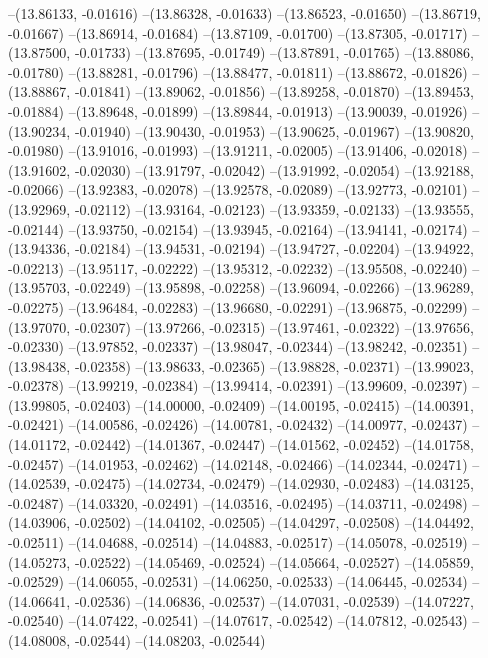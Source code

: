 --(13.86133, -0.01616)
--(13.86328, -0.01633)
--(13.86523, -0.01650)
--(13.86719, -0.01667)
--(13.86914, -0.01684)
--(13.87109, -0.01700)
--(13.87305, -0.01717)
--(13.87500, -0.01733)
--(13.87695, -0.01749)
--(13.87891, -0.01765)
--(13.88086, -0.01780)
--(13.88281, -0.01796)
--(13.88477, -0.01811)
--(13.88672, -0.01826)
--(13.88867, -0.01841)
--(13.89062, -0.01856)
--(13.89258, -0.01870)
--(13.89453, -0.01884)
--(13.89648, -0.01899)
--(13.89844, -0.01913)
--(13.90039, -0.01926)
--(13.90234, -0.01940)
--(13.90430, -0.01953)
--(13.90625, -0.01967)
--(13.90820, -0.01980)
--(13.91016, -0.01993)
--(13.91211, -0.02005)
--(13.91406, -0.02018)
--(13.91602, -0.02030)
--(13.91797, -0.02042)
--(13.91992, -0.02054)
--(13.92188, -0.02066)
--(13.92383, -0.02078)
--(13.92578, -0.02089)
--(13.92773, -0.02101)
--(13.92969, -0.02112)
--(13.93164, -0.02123)
--(13.93359, -0.02133)
--(13.93555, -0.02144)
--(13.93750, -0.02154)
--(13.93945, -0.02164)
--(13.94141, -0.02174)
--(13.94336, -0.02184)
--(13.94531, -0.02194)
--(13.94727, -0.02204)
--(13.94922, -0.02213)
--(13.95117, -0.02222)
--(13.95312, -0.02232)
--(13.95508, -0.02240)
--(13.95703, -0.02249)
--(13.95898, -0.02258)
--(13.96094, -0.02266)
--(13.96289, -0.02275)
--(13.96484, -0.02283)
--(13.96680, -0.02291)
--(13.96875, -0.02299)
--(13.97070, -0.02307)
--(13.97266, -0.02315)
--(13.97461, -0.02322)
--(13.97656, -0.02330)
--(13.97852, -0.02337)
--(13.98047, -0.02344)
--(13.98242, -0.02351)
--(13.98438, -0.02358)
--(13.98633, -0.02365)
--(13.98828, -0.02371)
--(13.99023, -0.02378)
--(13.99219, -0.02384)
--(13.99414, -0.02391)
--(13.99609, -0.02397)
--(13.99805, -0.02403)
--(14.00000, -0.02409)
--(14.00195, -0.02415)
--(14.00391, -0.02421)
--(14.00586, -0.02426)
--(14.00781, -0.02432)
--(14.00977, -0.02437)
--(14.01172, -0.02442)
--(14.01367, -0.02447)
--(14.01562, -0.02452)
--(14.01758, -0.02457)
--(14.01953, -0.02462)
--(14.02148, -0.02466)
--(14.02344, -0.02471)
--(14.02539, -0.02475)
--(14.02734, -0.02479)
--(14.02930, -0.02483)
--(14.03125, -0.02487)
--(14.03320, -0.02491)
--(14.03516, -0.02495)
--(14.03711, -0.02498)
--(14.03906, -0.02502)
--(14.04102, -0.02505)
--(14.04297, -0.02508)
--(14.04492, -0.02511)
--(14.04688, -0.02514)
--(14.04883, -0.02517)
--(14.05078, -0.02519)
--(14.05273, -0.02522)
--(14.05469, -0.02524)
--(14.05664, -0.02527)
--(14.05859, -0.02529)
--(14.06055, -0.02531)
--(14.06250, -0.02533)
--(14.06445, -0.02534)
--(14.06641, -0.02536)
--(14.06836, -0.02537)
--(14.07031, -0.02539)
--(14.07227, -0.02540)
--(14.07422, -0.02541)
--(14.07617, -0.02542)
--(14.07812, -0.02543)
--(14.08008, -0.02544)
--(14.08203, -0.02544)
